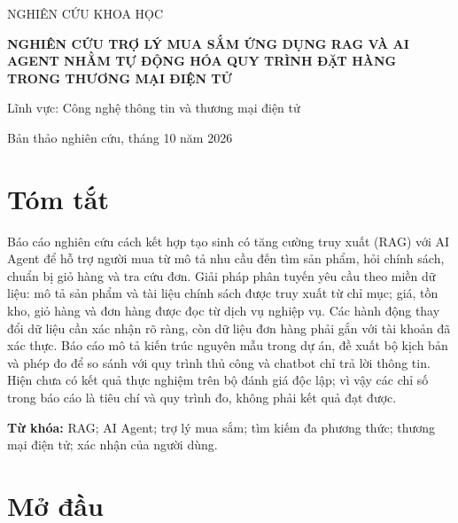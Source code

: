 \documentclass[12pt,a4paper,oneside]{report}
\begin{document}
\begin{titlepage}
\centering
{\large  NGHIÊN CỨU KHOA HỌC\par}
\vspace{3.4cm}
{\bfseries\LARGE NGHIÊN CỨU TRỢ LÝ MUA SẮM ỨNG DỤNG RAG VÀ AI AGENT NHẰM TỰ ĐỘNG HÓA QUY TRÌNH ĐẶT HÀNG TRONG THƯƠNG MẠI ĐIỆN TỬ\par}
\vspace{2cm}
{\large Lĩnh vực: Công nghệ thông tin và thương mại điện tử\par}
\vfill
{\large Bản thảo nghiên cứu, tháng 10 năm 2026\par}
\end{titlepage}

\chapter*{Tóm tắt}
Báo cáo nghiên cứu cách kết hợp tạo sinh có tăng cường truy xuất (RAG) với AI Agent để hỗ trợ người mua từ mô tả nhu cầu đến tìm sản phẩm, hỏi chính sách, chuẩn bị giỏ hàng và tra cứu đơn. Giải pháp phân tuyến yêu cầu theo miền dữ liệu: mô tả sản phẩm và tài liệu chính sách được truy xuất từ chỉ mục; giá, tồn kho, giỏ hàng và đơn hàng được đọc từ dịch vụ nghiệp vụ. Các hành động thay đổi dữ liệu cần xác nhận rõ ràng, còn dữ liệu đơn hàng phải gắn với tài khoản đã xác thực. Báo cáo mô tả kiến trúc nguyên mẫu trong dự án, đề xuất bộ kịch bản và phép đo để so sánh với quy trình thủ công và chatbot chỉ trả lời thông tin. Hiện chưa có kết quả thực nghiệm trên bộ đánh giá độc lập; vì vậy các chỉ số trong báo cáo là tiêu chí và quy trình đo, không phải kết quả đạt được.

\noindent\textbf{Từ khóa:} RAG; AI Agent; trợ lý mua sắm; tìm kiếm đa phương thức; thương mại điện tử; xác nhận của người dùng.

\tableofcontents
\clearpage{}

\chapter{Mở đầu}
\end{document}
